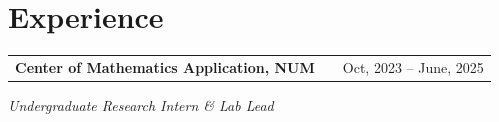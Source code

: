 \documentclass[a4paper,11pt]{article}
\makeatletter
\newenvironment{jobshort}[2]
    {
    \begin{tabularx}{\linewidth}{@{}l X r@{}}
    \textbf{#1} & \hfill &  #2 \\[3.75pt]
    \end{tabularx}
    }
    {
    }
\makeatother
\begin{document}


\vspace{-0.5em}
\section{Experience}
\begin{jobshort}{Center of Mathematics Application, NUM}{Oct, 2023 -- June, 2025}
\textit{Undergraduate Research Intern \& Lab Lead} \hfill 
\begin{itemize}[nosep,after=\strut,leftmargin=1em,itemsep=3pt,label=--]
    
    
    



\end{itemize}
\end{jobshort}
\end{document}
